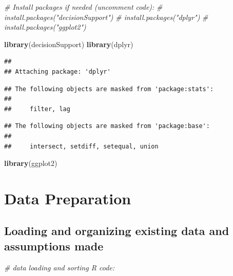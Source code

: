 \documentclass[
]{article}
\newenvironment{Shaded}{\begin{snugshade}}{\end{snugshade}}
\newcommand{\CommentTok}[1]{\textcolor[rgb]{0.56,0.35,0.01}{\textit{#1}}}
\newcommand{\FunctionTok}[1]{\textcolor[rgb]{0.13,0.29,0.53}{\textbf{#1}}}
\newcommand{\NormalTok}[1]{#1}
\begin{document}
\begin{Shaded}
\begin{Highlighting}[]
\CommentTok{\# Install packages if needed (uncomment code):}
\CommentTok{\# install.packages("decisionSupport")}
\CommentTok{\# install.packages("dplyr")}
\CommentTok{\# install.packages("ggplot2")}

\FunctionTok{library}\NormalTok{(decisionSupport)}
\FunctionTok{library}\NormalTok{(dplyr)}
\end{Highlighting}
\end{Shaded}

\begin{verbatim}
## 
## Attaching package: 'dplyr'
\end{verbatim}

\begin{verbatim}
## The following objects are masked from 'package:stats':
## 
##     filter, lag
\end{verbatim}

\begin{verbatim}
## The following objects are masked from 'package:base':
## 
##     intersect, setdiff, setequal, union
\end{verbatim}

\begin{Shaded}
\begin{Highlighting}[]
\FunctionTok{library}\NormalTok{(ggplot2)}
\end{Highlighting}
\end{Shaded}

\hypertarget{data-preparation}{%
\section{Data Preparation}\label{data-preparation}}

\hypertarget{loading-and-organizing-existing-data-and-assumptions-made}{%
\subsection{Loading and organizing existing data and assumptions
made}\label{loading-and-organizing-existing-data-and-assumptions-made}}

\begin{Shaded}
\begin{Highlighting}[]
\CommentTok{\# data loading and sorting R code:}
\end{Highlighting}
\end{Shaded}
\end{document}
